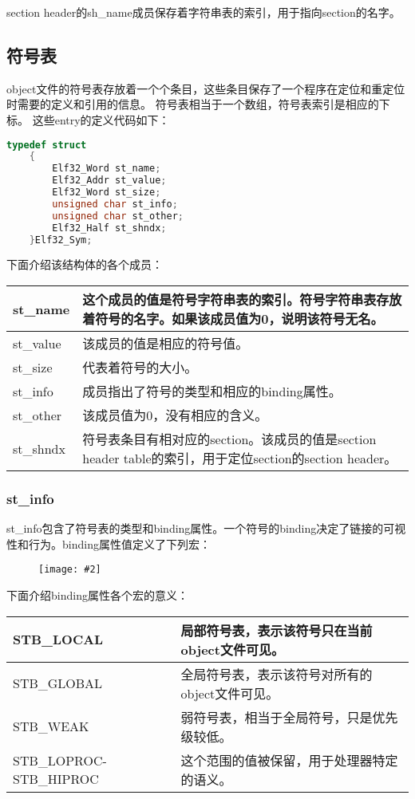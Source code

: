 \documentclass[a4paper,left=2.5cm,right=2.5cm,11pt]{article}
\newcommand{\sizedfic}[2]{\begin{figure}[H]
		\center
		\texttt{[image: \#2]}
	\end{figure}}
\begin{document}
	section header的sh\_name成员保存着字符串表的索引，用于指向section的名字。

\subsection{符号表}
	object文件的符号表存放着一个个条目，这些条目保存了一个程序在定位和重定位时需要的定义和引用的信息。
	符号表相当于一个数组，符号表索引是相应的下标。
	这些entry的定义代码如下：
	\begin{lstlisting}[language = C]
	typedef struct
	{
		Elf32_Word st_name;
		Elf32_Addr st_value;
		Elf32_Word st_size;
		unsigned char st_info;
		unsigned char st_other;
		Elf32_Half st_shndx;
	}Elf32_Sym;
	\end{lstlisting}

	下面介绍该结构体的各个成员：
	\vspace{0.5em}
	\begin{longtable}{p{2cm}p{8cm}}
	\hline
	st\_name & 这个成员的值是符号字符串表的索引。符号字符串表存放着符号的名字。如果该成员值为0，说明该符号无名。\\
	\hline
	st\_value & 该成员的值是相应的符号值。 \\
	\hline
	st\_size & 代表着符号的大小。\\
	\hline
	st\_info & 成员指出了符号的类型和相应的binding属性。\\
	\hline
	st\_other & 该成员值为0，没有相应的含义。\\
	\hline
	st\_shndx & 符号表条目有相对应的section。该成员的值是section header table的索引，用于定位section的section header。\\
	\hline
	\end{longtable}

\subsubsection{st\_info}
	st\_info包含了符号表的类型和binding属性。一个符号的binding决定了链接的可视性和行为。binding属性值定义了下列宏：
	\sizedfic{0.5}{19.png}

	下面介绍binding属性各个宏的意义：
	\vspace{0.5em}
	\begin{longtable}{p{3cm}p{8cm}}
	\hline
	STB\_LOCAL & 局部符号表，表示该符号只在当前object文件可见。\\
	\hline
	STB\_GLOBAL & 全局符号表，表示该符号对所有的object文件可见。\\
	\hline
	STB\_WEAK & 弱符号表，相当于全局符号，只是优先级较低。\\
	\hline
	STB\_LOPROC-STB\_HIPROC & 这个范围的值被保留，用于处理器特定的语义。\\
	\hline
	\end{longtable}
	\vspace{0.5em}
\end{document}

